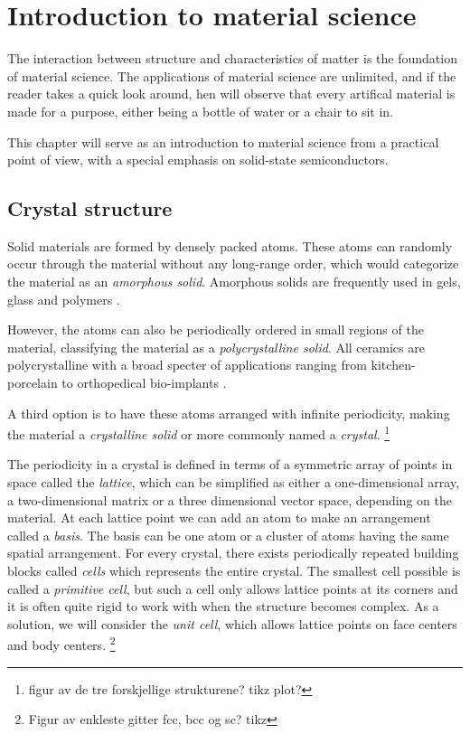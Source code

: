 \chapter{Introduction to material science}

The interaction between structure and characteristics of matter is the foundation of material science. The applications of material science are unlimited, and if the reader takes a quick look around, hen will observe that every artifical material is made for a purpose, either being a bottle of water or a chair to sit in.

This chapter will serve as an introduction to material science from a practical point of view, with a special emphasis on solid-state semiconductors.

\section{Crystal structure}

Solid materials are formed by densely packed atoms. These atoms can randomly occur through the material without any long-range order, which would categorize the material as an \textit{amorphous solid}. Amorphous solids are frequently used in gels, glass and polymers \cite{BenStreetman2015}.

However, the atoms can also be periodically ordered in small regions of the material, classifying the material as a \textit{polycrystalline solid}. All ceramics are polycrystalline with a broad specter of applications ranging from kitchen-porcelain to orthopedical bio-implants \cite{Renganathan2018}.

A third option is to have these atoms arranged with infinite periodicity, making the material a \textit{crystalline solid} or more commonly named a \textit{crystal}. \footnote{figur av de tre forskjellige strukturene? tikz plot?}

The periodicity in a crystal is defined in terms of a symmetric array of points in space called the \textit{lattice}, which can be simplified as either a one-dimensional array, a two-dimensional matrix or a three dimensional vector space, depending on the material. At each lattice point we can add an atom to make an arrangement called a \textit{basis}. The basis can be one atom or a cluster of atoms having the same spatial arrangement. For every crystal, there exists periodically repeated building blocks called \textit{cells} which represents the entire crystal. The smallest cell possible is called a \textit{primitive cell}, but such a cell only allows lattice points at its corners and it is often quite rigid to work with when the structure becomes complex. As a solution, we will consider the \textit{unit cell}, which allows lattice points on face centers and body centers. \footnote{Figur av enkleste gitter fcc, bcc og sc? tikz}

